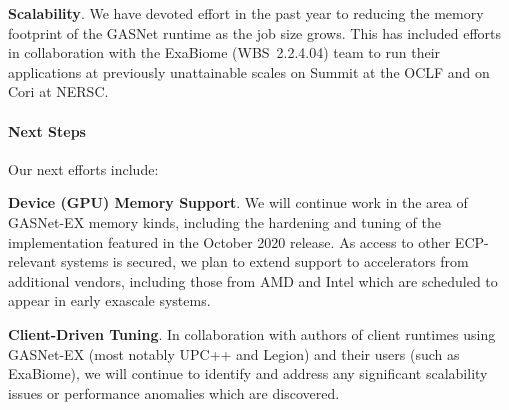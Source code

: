 \textbf{Scalability}.
We have devoted effort in the past year to reducing the memory footprint of the
GASNet runtime as the job size grows.  This has included efforts in
collaboration with the ExaBiome (WBS~2.2.4.04) team to run their applications
at previously unattainable scales on Summit at the OCLF and on Cori at NERSC.

\paragraph{Next Steps}

Our next efforts include:

\textbf{Device (GPU) Memory Support}.
We will continue work in the area of GASNet-EX memory kinds, including the
hardening and tuning of the implementation featured in the October 2020
release.  As access to other ECP-relevant systems is secured, we plan to extend
support to accelerators from additional vendors, including those from AMD and
Intel which are scheduled to appear in early exascale systems.

\textbf{Client-Driven Tuning}.
In collaboration with authors of client runtimes using GASNet-EX (most notably
UPC++ and Legion) and their users (such as ExaBiome), we will continue to
identify and address any significant scalability issues or performance
anomalies which are discovered.

\clearpage
